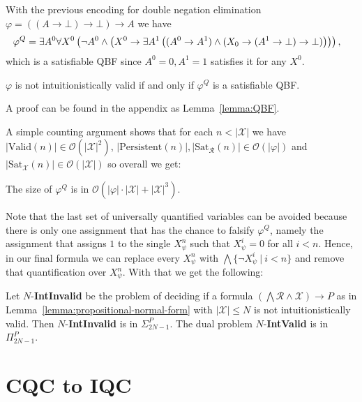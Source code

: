 \documentclass[runningheads]{llncs}
\begin{document}
\begin{example}
	With the previous encoding for double negation elimination $\varphi = ((A\to \bot)\to \bot)\to A$ we have
	$$\hspace*{-.3cm}
	\varphi^Q = \exists A^0\forall X^0\left(\neg A^0\wedge\left(X^0\to \exists A^1\left((A^0\to A^1)\wedge(X_0\to (A^1\to \bot)\to \bot)\right)\right)\right),
	$$
	which is a satisfiable QBF since $A^0 = 0, A^1 = 1$ satisfies it for any $X^0$.
\end{example}


\begin{lemma}
	$\varphi$ is not intuitionistically valid if and only if $\varphi^Q$ is a satisfiable QBF.
\end{lemma}
A proof can be found in the appendix as Lemma~\ref{lemma:QBF}.

A simple counting argument shows that for each $n < |\mathcal X|$ we have $|\text{Valid}(n)|\in \mathcal O(|\mathcal X|^2)$, $|\text{Persistent}(n)|, |\text{Sat}_{\mathcal R}(n)|\in \mathcal O(|\varphi|)$ and $|\text{Sat}_{\mathcal X}(n)|\in \mathcal O(|\mathcal X|)$ so overall we get:
\begin{lemma}
	The size of $\varphi^Q$ is in $\mathcal O(|\varphi|\cdot|\mathcal X| + |\mathcal X|^3)$.
\end{lemma}

Note that the last set of universally quantified variables can be avoided because there is only one assignment that has the chance to falsify $\varphi^Q$, namely the assignment that assigns $1$ to the single $X_\psi^n$ such that $X_\psi^i = 0$ for all $i < n$. Hence, in our final formula we can replace every $X_\psi^n$ with $\bigwedge\{\neg X_\psi^i\:|\:i < n\}$ and remove that quantification over $X_\psi^n$. With that we get the following:

\begin{corollary}
	Let $N$-\textbf{IntInvalid} be the problem of deciding if a formula $(\bigwedge \mathcal R\wedge\mathcal X)\to P$ as in Lemma~\ref{lemma:propositional-normal-form} with $|\mathcal X|\leq N$ is not intuitionistically valid. Then $N$-\textbf{IntInvalid} is in $\Sigma_{2N-1}^P$. The dual problem $N$-\textbf{IntValid} is in $\Pi_{2N-1}^P$.
\end{corollary}


\section{CQC to IQC}
\end{document}
